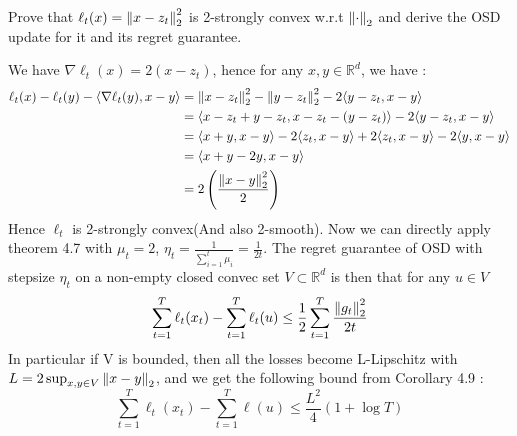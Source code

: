\begin{exercise}[]{}
	Prove that $ \ell_t(x) = \left\|x-z_t\right\|_2^2 $ is 2-strongly convex w.r.t $ \left\|\cdot \right\|_2 $ and derive the OSD update for it and its regret guarantee.
\end{exercise}

\begin{solution}[]
	We have $ \nabla \ell_t(x) = 2(x-z_t) $, hence for any $ x,y\in \mathbb{R}^d $, we have :
\begin{align*}
	\ell_t(x) - \ell_t(y) - \langle\nabla \ell_t(y),x-y\rangle &= \left\|x-z_t\right\|_2^2 - \left\|y-z_t\right\|_2^2 - 2\langle y-z_t,x-y\rangle \\
							       &= \langle x-z_t + y-z_t,x-z_t-(y-z_t)\rangle - 2\langle y-z_t,x-y\rangle \\
							       &= \langle x+y,x-y\rangle - 2 \langle z_t,x-y\rangle +2 \langle z_t,x-y\rangle - 2 \langle y,x-y\rangle \\
							       &= \langle x+y - 2y,x-y\rangle \\
							       &= 2\left( \frac{\left\|x-y\right\|_2^2}{2} \right)
\end{align*}
Hence $ \ell_t $ is 2-strongly convex(And also 2-smooth). Now we can directly apply theorem 4.7 with $ \mu_t = 2 $, $ \eta_t = \frac{1}{\sum_{i=1}^{t} \mu_i} = \frac{1}{2t} $. The regret guarantee of OSD with stepsize $ \eta_t $ on a non-empty closed convec set $ V\subset \mathbb{R}^d $ is then that for any $ u\in V $
\begin{equation*}
	\sum_{t=1}^{T}\ell_t(x_t) - \sum_{t=1}^{T}\ell_t(u) \leq \frac{1}{2} \sum_{t=1}^{T}\frac{\left\|g_t\right\|_2^2}{2t}
\end{equation*}
In particular if V is bounded, then all the losses become L-Lipschitz with$ L= 2\sup_{x,y\in V}\left\|x-y\right\|_2 $, and we get the following bound from Corollary 4.9 :
\begin{equation*}
	\sum_{t=1}^{T}\ell_t(x_t) - \sum_{t=1}^{T}\ell(u) \leq \frac{L^2}{4}(1+\log T)
\end{equation*}


\end{solution}
